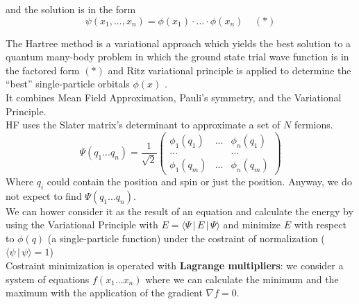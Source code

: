 and the solution is in the form 
 \[
 \psi(x_1, ..., x_n) = \phi(x_1) \cdot ... \cdot \phi(x_n) \;\;\;\; (*)
 \]

The Hartree method is a variational approach which yields the best solution
to a quantum many-body problem in which the ground state trial wave
function is in the factored form $(*)$ and Ritz variational principle is applied to
determine the “best” single-particle orbitals $\phi(x)$ . \\
It combines Mean Field Approximation, Pauli's symmetry, and the Variational Principle.\\
HF uses the Slater matrix's determinant to approximate a set of $N$ fermions.
\[
\Psi(q_1...q_n)=\frac{1}{\sqrt{2}}
\begin{pmatrix}
\phi_1(q_1)&...&\phi_n(q_1)\\
... & &...\\
\phi_1(q_m)&...&\phi_n(q_m)
\end{pmatrix}
\]
Where $q_i$ could contain the position and spin or just the position. Anyway, we do not expect to find $\Psi(q_1...q_n)$. \\
We can hower consider it as the result of an equation and calculate the energy by using the Variational Principle with $E=\langle \Psi\,|\,E\,|\,\Psi \rangle$ and minimize $E$ with respect to $\phi(q)$ (a single-particle function) under the costraint of normalization ($\langle \psi\,|\,\psi \rangle =1$)\\
Costraint minimization is operated with \textbf{Lagrange multipliers}: we consider a system of equations $f(x_1...x_n)$ where we can calculate the minimum and the maximum with the application of the gradient $\nabla f=0$.\\

